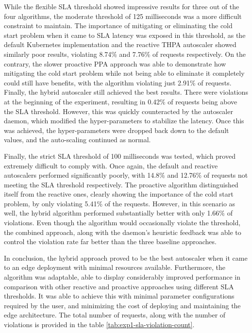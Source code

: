 While the flexible SLA threshold showed impressive results for three out of the four algorithms, the moderate threshold of 125 milliseconds was a more difficult constraint to maintain. The importance of mitigating or eliminating the cold start problem when it came to SLA latency was exposed in this threshold, as the default Kubernetes implementation and the reactive THPA autoscaler showed similarly poor results, violating 8.74\% and 7.76\% of requests respectively. On the contrary, the slower proactive PPA approach was able to demonstrate how mitigating the cold start problem while not being able to eliminate it completely could still have benefits, with the algorithm violating just 2.91\% of requests. Finally, the hybrid autoscaler still achieved the best results. There were violations at the beginning of the experiment, resulting in 0.42\% of requests being above the SLA threshold. However, this was quickly counteracted by the autoscaler daemon, which modified the hyper-parameters to stabilize the latency. Once this was achieved, the hyper-parameters were dropped back down to the default values, and the auto-scaling continued as normal.\par

Finally, the strict SLA threshold of 100 milliseconds was tested, which proved extremely difficult to comply with. Once again, the default and reactive autoscalers performed significantly poorly, with 14.8\% and 12.76\% of requests not meeting the SLA threshold respectively. The proactive algorithm distinguished itself from the reactive ones, clearly showing the importance of the cold start problem, by only violating 5.41\% of the requests. However, in this scenario as well, the hybrid algorithm performed substantially better with only 1.66\% of violations. Even though the algorithm would occasionally violate the threshold, the combined approach, along with the daemon's heuristic feedback was able to control the violation rate far better than the three baseline approaches.\par

In conclusion, the hybrid approach proved to be the best autoscaler when it came to an edge deployment with minimal resources available. Furthermore, the algorithm was adaptable, able to display considerably improved performance in comparison with other reactive and proactive approaches using different SLA thresholds. It was able to achieve this with minimal parameter configurations required by the user, and minimizing the cost of deploying and maintaining the edge architecture. The total number of requests, along with the number of violations is provided in the table \ref{tab:exp1-sla-violation-count}.

